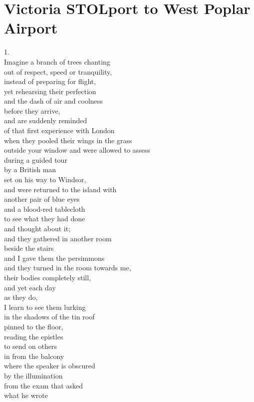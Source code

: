 \documentclass[smalldemyvopaper,11pt,twoside,onecolumn,openright,extrafontsizes]{memoir}
\begin{document}
\chapter{Victoria STOLport to West Poplar Airport}
1.
\\Imagine a branch of trees chanting
\\out of respect, speed or tranquility,
\\instead of preparing for flight,
\\yet rehearsing their perfection
\\and the dash of air and coolness
\\before they arrive,
\\and are suddenly reminded
\\of that first experience with London
\\when they pooled their wings in the grass
\\outside your window and were allowed to assess
\\during a guided tour
\\by a British man
\\set on his way to Windsor,
\\and were returned to the island with
\\another pair of blue eyes
\\and a blood-red tablecloth
\\to see what they had done
\\and thought about it;
\\and they gathered in another room
\\beside the stairs
\\and I gave them the persimmons
\\and they turned in the room towards me,
\\their bodies completely still,
\\and yet each day
\\as they do,
\\I learn to see them lurking
\\in the shadows of the tin roof
\\pinned to the floor,
\\reading the epistles
\\to send on others
\\in from the balcony
\\where the speaker is obscured
\\by the illumination
\\from the exam that asked
\\what he wrote
\end{document}

